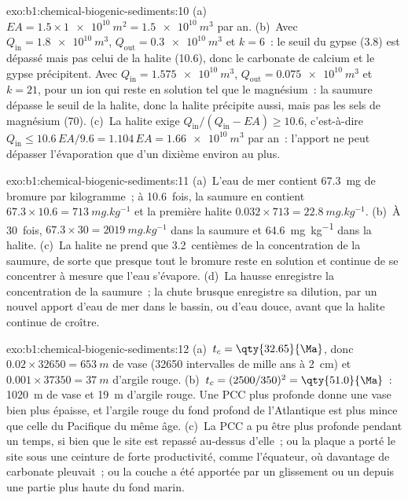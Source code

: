 \begin{solution}{exo:b1:chemical-biogenic-sediments:10}
(a)~$EA = 1.5\times\qty{1e10}{m^2} = \qty{1.5e10}{m^3}$ par an. (b)~Avec
$Q_{\mathrm{in}} = \qty{1.8e10}{m^3}$, $Q_{\mathrm{out}} = \qty{0.3e10}{m^3}$ et
$k = 6$~: le seuil du gypse (3.8) est dépassé mais pas celui de la halite (10.6), donc
le carbonate de calcium et le gypse précipitent. Avec $Q_{\mathrm{in}} =
\qty{1.575e10}{m^3}$, $Q_{\mathrm{out}} = \qty{0.075e10}{m^3}$ et $k = 21$, pour
un ion qui reste en solution tel que le magnésium~: la saumure dépasse le seuil de la
halite, donc la halite précipite aussi, mais pas les sels de magnésium (70).
(c)~La halite exige $Q_{\mathrm{in}}/(Q_{\mathrm{in}} - EA) \ge 10.6$, c'est-à-dire
$Q_{\mathrm{in}} \le 10.6\,EA/9.6 = 1.104\,EA = \qty{1.66e10}{m^3}$ par an~:
l'apport ne peut dépasser l'évaporation que d'un dixième environ au plus.
\end{solution}

\begin{solution}{exo:b1:chemical-biogenic-sediments:11}
(a)~L'eau de mer contient \qty{67.3}{mg} de bromure par kilogramme~; à 10.6~fois, la
saumure en contient $67.3\times10.6 = \qty{713}{mg.kg^{-1}}$ et la première halite
$0.032\times713 = \qty{22.8}{mg.kg^{-1}}$. (b)~À 30~fois, $67.3\times30 =
\qty{2019}{mg.kg^{-1}}$ dans la saumure et \qty{64.6}{mg.kg^{-1}} dans la halite.
(c)~La halite ne prend que 3.2~centièmes de la concentration de la saumure, de sorte que
presque tout le bromure reste en solution et continue de se concentrer à mesure que l'eau
s'évapore. (d)~La hausse enregistre la concentration de la saumure~; la chute brusque
enregistre sa dilution, par un nouvel apport d'eau de mer dans le bassin, ou d'eau
douce, avant que la halite continue de croître.
\end{solution}

\begin{solution}{exo:b1:chemical-biogenic-sediments:12}
(a)~$t_c = \qty{32.65}{\Ma}$, donc $0.02\times\num{32650} = \qty{653}{m}$ de
vase (\num{32650} intervalles de mille ans à \qty{2}{cm}) et
$0.001\times\num{37350} = \qty{37}{m}$ d'argile rouge. (b)~$t_c = (2500/350)^2 =
\qty{51.0}{\Ma}$~: \qty{1020}{m} de vase et \qty{19}{m} d'argile rouge. Une PCC plus profonde
donne une vase bien plus épaisse, et l'argile rouge du fond profond de l'Atlantique est plus mince
que celle du Pacifique du même âge. (c)~La PCC a pu être plus profonde pendant un
temps, si bien que le site est repassé au-dessus d'elle~; ou la plaque a porté le site sous
une ceinture de forte productivité, comme l'équateur, où davantage de carbonate pleuvait~;
ou la couche a été apportée par un glissement ou un  depuis une partie
plus haute du fond marin.
\end{solution}

